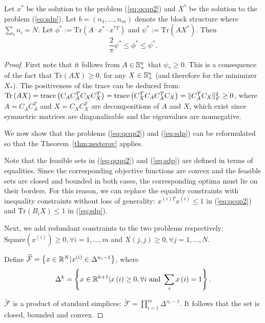 \begin{theorem}
Let
$x^{*}$ be the solution to the problem (\ref{eq:qcqp2}) and
$X^*$ be the solution to the problem (\ref{eq:sdp}).
Let $b = \left(n_1,\ldots,n_m\right)$ denote the block structure where $\sum_i n_i = N$.
Let $\phi^*:= \mathrm{Tr}\left(A \cdot x^{*} \cdot x^{*T}\right)$ and
$\psi^* := \mathrm{Tr}\left(A X^{*}\right)$.
Then $$\frac{2}{\pi} \psi^* \leq \phi^* \leq \psi^*.$$
\end{theorem}

\begin{proof}
First note that it follows from $A \in \mathbb{S}_{+}^n$ that $\psi_* \geq
0$. This is a consequence of the fact that $\mathrm{Tr}\left(A X \right) \geq 0$, for any $X \in \mathbb{S}_+^n$
(and therefore for the minimizer $X_*$). The positiveness of the trace can be deduced from:
$\mathrm{Tr}\left(A X \right) = \mathrm{trace}\left(C_A C_A^T C_X C_X^T \right) =
\mathrm{trace}\left(C_X^T C_A C_A^T C_X \right) = \lVert C_A^T C_X\rVert_F^2 \geq 0 $,
where $A = C_A C_A^T$ and $X = C_X C_X^T$ are decompositions of $A$ and $X$, which exist since
symmetric matrices are diagonalizable and the eigenvalues are nonnegative.

We now show that the problems (\ref{eq:qcqp2}) and (\ref{eq:sdp}) can be reformulated
so that the Theorem~\ref{thm:nesterov} applies.

Note that the feasible sets in (\ref{eq:qcqp2}) and
(\ref{eq:sdp}) are defined in terms of equalities. Since the corresponding objective
functions are convex and the feasible sets are closed and bounded in
both cases, the corresponding optima must lie on their borders. For this reason, we can
replace the equality constraints with inequality constraints without loss of generality:
$x^{(i)T}x^{(i)} \leq 1$ in (\ref{eq:qcqp2}) and $\mathrm{Tr} \left(B_i X\right) \leq 1$
in (\ref{eq:sdp}).

Next, we add redundant constraints to the two problems respectively:
$\mathrm{Square}\left(x^{(i)}\right) \geq 0, \forall i = 1,\ldots,m$
and $X\left(j,j\right) \geq 0, \forall j = 1,\ldots, N$.

Define $\widetilde{\mathcal{F}} = \left\{x \in \mathbb{R}^N | x^{(i)} \in \Delta^{n_i -1} \right\}$,
where $$\Delta^{k} = \left\{ x \in \mathbb{R}^{k+1} | x\left(i\right) \geq 0, \forall i ~\mathrm{and}~ \sum_i x\left(i\right) = 1 \right\}.$$

$\widetilde{\mathcal{F}}$ is a product of standard simplices: $\widetilde{\mathcal{F}} = \prod_{i = 1}^m \Delta^{n_i -1}$. It follows that the set is closed, bounded and convex.


\end{proof}
